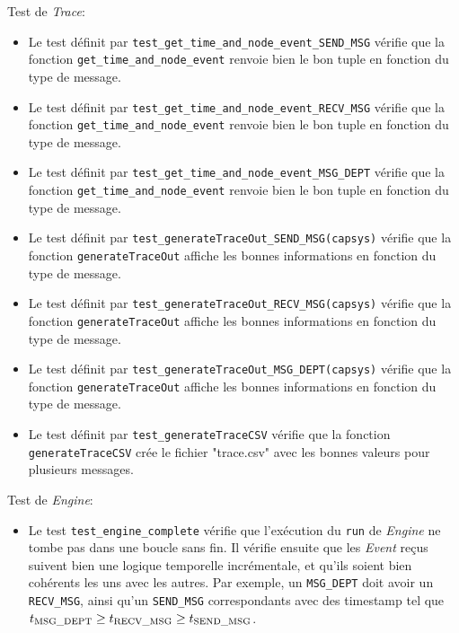 \documentclass[11pt,a4paper]{article}
\begin{document}
Test de \emph{Trace}:
\begin{itemize}
    \item Le test définit par \lstinline|test_get_time_and_node_event_SEND_MSG| vérifie que la fonction \lstinline|get_time_and_node_event| renvoie bien le bon tuple en fonction du type de message.
    \item Le test définit par \lstinline|test_get_time_and_node_event_RECV_MSG| vérifie que la fonction \lstinline|get_time_and_node_event| renvoie bien le bon tuple en fonction du type de message.
    \item Le test définit par \lstinline|test_get_time_and_node_event_MSG_DEPT| vérifie que la fonction \lstinline|get_time_and_node_event| renvoie bien le bon tuple en fonction du type de message.
    \item Le test définit par \lstinline|test_generateTraceOut_SEND_MSG(capsys)| vérifie que la fonction \lstinline|generateTraceOut| affiche les bonnes informations en fonction du type de message.
    \item Le test définit par \lstinline|test_generateTraceOut_RECV_MSG(capsys)| vérifie que la fonction \lstinline|generateTraceOut| affiche les bonnes informations en fonction du type de message.
    \item Le test définit par \lstinline|test_generateTraceOut_MSG_DEPT(capsys)| vérifie que la fonction \lstinline|generateTraceOut| affiche les bonnes informations en fonction du type de message.
    \item Le test définit par \lstinline|test_generateTraceCSV| vérifie que la fonction \lstinline|generateTraceCSV| crée le fichier "trace.csv" avec les bonnes valeurs pour plusieurs messages.
\end{itemize}

\bigskip

Test de \emph{Engine}:
\begin{itemize}
    \item Le test \lstinline|test_engine_complete| vérifie que l'exécution du \lstinline|run| de \emph{Engine} ne tombe pas dans une boucle sans fin. Il vérifie ensuite que les \emph{Event} reçus suivent bien une logique temporelle incrémentale, et qu'ils soient bien cohérents les uns avec les autres. Par exemple, un \lstinline|MSG_DEPT| doit avoir un \lstinline|RECV_MSG|, ainsi qu'un \lstinline|SEND_MSG| correspondants avec des timestamp tel que $t\textsubscript{MSG\_DEPT} \geq t\textsubscript{RECV\_MSG} \geq t\textsubscript{SEND\_MSG}$.
\end{itemize}
\end{document}
